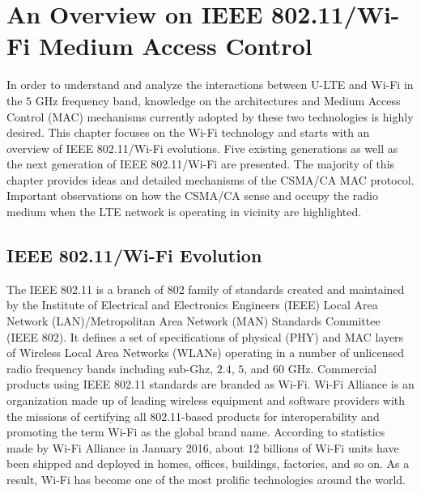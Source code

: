 %
%
%
\chapter{An Overview on IEEE 802.11/Wi-Fi Medium Access Control}
\label{overview-wifi}


In order to understand and analyze the interactions between U-LTE and Wi-Fi in the $5$ GHz frequency band, knowledge on the architectures and Medium Access Control (MAC) mechanisms currently adopted by these two technologies is highly desired. This chapter focuses on the Wi-Fi technology and starts with an overview of IEEE 802.11/Wi-Fi evolutions. Five existing generations as well as the next generation of IEEE 802.11/Wi-Fi are presented. The majority of this chapter provides ideas and detailed mechanisms of the CSMA/CA MAC protocol. Important observations on how the CSMA/CA sense and occupy the radio medium when the LTE network is operating in vicinity are highlighted.

\section{IEEE 802.11/Wi-Fi Evolution}
\label{wifi-lbt}

The IEEE 802.11 is a branch of 802 family of standards created and maintained by the Institute of Electrical and Electronics Engineers (IEEE) Local Area Network (LAN)/Metropolitan Area Network (MAN) Standards Committee (IEEE 802). It defines a set of specifications of physical (PHY) and MAC layers of Wireless Local Area Networks (WLANs) operating in a number of unlicensed radio frequency bands including sub-Ghz, $2.4$, $5$, and $60$ GHz. Commercial products using IEEE 802.11 standards are branded as Wi-Fi. Wi-Fi Alliance is an organization made up of leading wireless equipment and software providers with the missions of certifying all 802.11-based products for interoperability and promoting the term Wi-Fi as the global brand name. According to statistics made by Wi-Fi Alliance in January 2016, about $12$ billions of Wi-Fi units have been shipped and deployed in homes, offices, buildings, factories, and so on. As a result, Wi-Fi has become one of the most prolific technologies around the world. 

